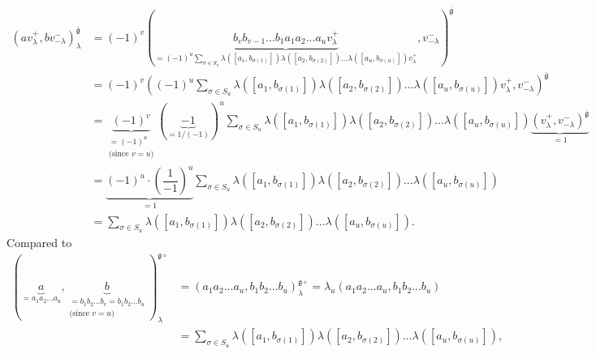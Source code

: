 \documentclass
[numbers=enddot,12pt,final,onecolumn,german,notitlepage]{scrartcl}%
\theoremstyle{definition}
\begin{document}
\begin{align*}
\left(  av_{\lambda}^{+},bv_{-\lambda}^{-}\right)  _{\lambda}^{\overline
{\mathfrak{g}}}  &  =\left(  -1\right)  ^{v}\left(  \underbrace{b_{v}%
b_{v-1}...b_{1}a_{1}a_{2}...a_{u}v_{\lambda}^{+}}_{=\left(  -1\right)
^{u}\sum\limits_{\sigma\in S_{u}}\lambda\left(  \left[  a_{1},b_{\sigma\left(
1\right)  }\right]  \right)  \lambda\left(  \left[  a_{2},b_{\sigma\left(
2\right)  }\right]  \right)  ...\lambda\left(  \left[  a_{u},b_{\sigma\left(
u\right)  }\right]  \right)  v_{\lambda}^{+}},v_{-\lambda}^{-}\right)
^{\overline{\mathfrak{g}}}\\
&  =\left(  -1\right)  ^{v}\left(  \left(  -1\right)  ^{u}\sum\limits_{\sigma
\in S_{u}}\lambda\left(  \left[  a_{1},b_{\sigma\left(  1\right)  }\right]
\right)  \lambda\left(  \left[  a_{2},b_{\sigma\left(  2\right)  }\right]
\right)  ...\lambda\left(  \left[  a_{u},b_{\sigma\left(  u\right)  }\right]
\right)  v_{\lambda}^{+},v_{-\lambda}^{-}\right)  ^{\overline{\mathfrak{g}}}\\
&  =\underbrace{\left(  -1\right)  ^{v}}_{\substack{=\left(  -1\right)
^{u}\\\text{(since }v=u\text{)}}}\left(  \underbrace{-1}_{=1/\left(
-1\right)  }\right)  ^{u}\sum\limits_{\sigma\in S_{u}}\lambda\left(  \left[
a_{1},b_{\sigma\left(  1\right)  }\right]  \right)  \lambda\left(  \left[
a_{2},b_{\sigma\left(  2\right)  }\right]  \right)  ...\lambda\left(  \left[
a_{u},b_{\sigma\left(  u\right)  }\right]  \right)  \underbrace{\left(
v_{\lambda}^{+},v_{-\lambda}^{-}\right)  ^{\overline{\mathfrak{g}}}}_{=1}\\
&  =\underbrace{\left(  -1\right)  ^{u}\cdot\left(  \dfrac{1}{-1}\right)
^{u}}_{=1}\sum\limits_{\sigma\in S_{u}}\lambda\left(  \left[  a_{1}%
,b_{\sigma\left(  1\right)  }\right]  \right)  \lambda\left(  \left[
a_{2},b_{\sigma\left(  2\right)  }\right]  \right)  ...\lambda\left(  \left[
a_{u},b_{\sigma\left(  u\right)  }\right]  \right) \\
&  =\sum\limits_{\sigma\in S_{u}}\lambda\left(  \left[  a_{1},b_{\sigma\left(
1\right)  }\right]  \right)  \lambda\left(  \left[  a_{2},b_{\sigma\left(
2\right)  }\right]  \right)  ...\lambda\left(  \left[  a_{u},b_{\sigma\left(
u\right)  }\right]  \right)  .
\end{align*}
Compared to%
\begin{align*}
\left(  \underbrace{a}_{=a_{1}a_{2}...a_{u}},\underbrace{b}_{\substack{=b_{1}%
b_{2}...b_{v}=b_{1}b_{2}...b_{u}\\\text{(since }v=u\text{)}}}\right)
_{\lambda}^{\mathfrak{g}\circ}  &  =\left(  a_{1}a_{2}...a_{u},b_{1}%
b_{2}...b_{u}\right)  _{\lambda}^{\mathfrak{g}\circ}=\lambda_{u}\left(
a_{1}a_{2}...a_{u},b_{1}b_{2}...b_{u}\right) \\
&  =\sum\limits_{\sigma\in S_{u}}\lambda\left(  \left[  a_{1},b_{\sigma\left(
1\right)  }\right]  \right)  \lambda\left(  \left[  a_{2},b_{\sigma\left(
2\right)  }\right]  \right)  ...\lambda\left(  \left[  a_{u},b_{\sigma\left(
u\right)  }\right]  \right)  ,
\end{align*}
\end{document}
